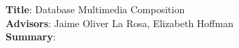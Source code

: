 \textbf{Title}: 
Database Multimedia Composition
\\
\textbf{Advisors}:
Jaime Oliver La Rosa, Elizabeth Hoffman
\\
\textbf{Summary}: 